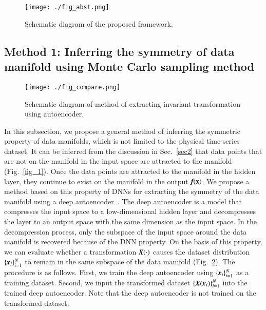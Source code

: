 \documentclass[preprint,
bibnotes,
 amsmath,amssymb,
 aps,
]{revtex4-1}
\begin{document}
\begin{figure}[htbp]
  \begin{center}
   \texttt{[image: ./fig\_abst.png]}
  \caption{Schematic diagram of the proposed framework.}
  \label{fig_abst}
  \end{center}
\end{figure}

\subsection{Method 1: Inferring the symmetry of data manifold using Monte Carlo sampling method}
\label{sec_extract}
\begin{figure}
 \begin{center}
    \texttt{[image: ./fig\_compare.png]}
    \caption{Schematic diagram of method of extracting invariant transformation using autoencoder.}
    \label{fig_2}
 \end{center}
\end{figure}
In this subsection, we propose a general method of inferring the symmetric property of data manifolds, which is not limited to the physical time-series dataset. 
It can be inferred from the discussion in Sec.~\ref{sec2} that data points that are not on the manifold in the input space are attracted to the manifold (Fig.~\ref{fig_1}). 
Once the data points are attracted to the manifold in the hidden layer, they continue to exist on the manifold in the output $\textit{\textbf{f}}({\bf x})$. 
We propose a method based on this property of DNNs for extracting the symmetry of the data manifold using a deep autoencoder~\cite{Hinton_Reducing_2006}. 
The deep autoencoder is a model that compresses the input space to a low-dimensional hidden layer and decompresses the layer to an output space with the same dimension as the input space. 
In the decompression process, only the subspace of the input space around the data manifold is recovered because of the DNN property. 
On the basis of this property, we can evaluate whether a transformation $\textit{\textbf{X}}(\cdot)$ causes the dataset distribution $\{ \textit{\textbf{x}}_i\}_{i=1}^N$ to remain in the same subspace of the data manifold (Fig.~\ref{fig_2}). 
The procedure is as follows. 
First, we train the deep autoencoder using $\{ \textit{\textbf{x}}_i\}_{i=1}^N$ as a training dataset. 
Second, we input the transformed dataset $\left\{\textit{\textbf{X}}( \textit{\textbf{x}}_i)\right\}_{i=1}^N$ into the trained deep autoencoder. Note that the deep autoencoder is not trained on the transformed dataset. 
\end{document}
